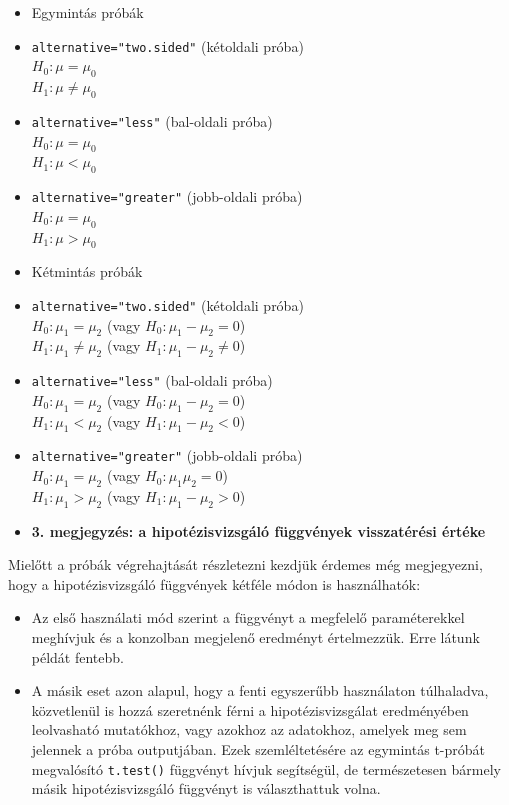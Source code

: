 \documentclass[
]{book}
\providecommand{\tightlist}{%
  \setlength{\itemsep}{0pt}\setlength{\parskip}{0pt}}
\begin{document}
\begin{itemize}
\item
  Egymintás próbák
\item
  \texttt{alternative="two.sided"} (kétoldali próba)\\
  \(H_0:\mu=\mu_0\)\\
  \(H_1:\mu\neq\mu_0\)
\item
  \texttt{alternative="less"} (bal-oldali próba)\\
  \(H_0:\mu=\mu_0\)\\
  \(H_1:\mu < \mu_0\)
\item
  \texttt{alternative="greater"} (jobb-oldali próba)\\
  \(H_0:\mu=\mu_0\)\\
  \(H_1:\mu > \mu_0\)
\item
  Kétmintás próbák
\item
  \texttt{alternative="two.sided"} (kétoldali próba)\\
  \(H_0:\mu_1=\mu_2\) (vagy \(H_0:\mu_1-\mu_2=0\))\\
  \(H_1:\mu_1\neq\mu_2\) (vagy \(H_1:\mu_1-\mu_2 \neq 0\))\\
\item
  \texttt{alternative="less"} (bal-oldali próba)\\
  \(H_0:\mu_1=\mu_2\) (vagy \(H_0:\mu_1-\mu_2=0\))\\
  \(H_1:\mu_1 < \mu_2\) (vagy \(H_1:\mu_1-\mu_2 < 0\))
\item
  \texttt{alternative="greater"} (jobb-oldali próba)\\
  \(H_0:\mu_1=\mu_2\) (vagy \(H_0:\mu_1\mu_2=0\))\\
  \(H_1:\mu_1 > \mu_2\) (vagy \(H_1:\mu_1-\mu_2 > 0\))
\item
  \textbf{3. megjegyzés: a hipotézisvizsgáló függvények visszatérési értéke}
\end{itemize}

Mielőtt a próbák végrehajtását részletezni kezdjük érdemes még megjegyezni, hogy a hipotézisvizsgáló függvények kétféle módon is használhatók:

\begin{itemize}
\tightlist
\item
  Az első használati mód szerint a függvényt a megfelelő paraméterekkel meghívjuk és a konzolban megjelenő eredményt értelmezzük. Erre látunk példát fentebb.
\item
  A másik eset azon alapul, hogy a fenti egyszerűbb használaton túlhaladva, közvetlenül is hozzá szeretnénk férni a hipotézisvizsgálat eredményében leolvasható mutatókhoz, vagy azokhoz az adatokhoz, amelyek meg sem jelennek a próba outputjában. Ezek szemléltetésére az egymintás t-próbát megvalósító \texttt{t.test()} függvényt hívjuk segítségül, de természetesen bármely másik hipotézisvizsgáló függvényt is választhattuk volna.
\end{itemize}
\end{document}
